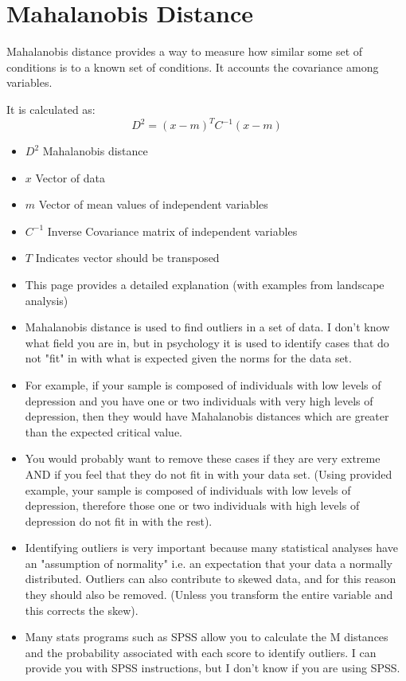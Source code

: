 \documentclass[11pt]{article} %
\begin{document}
\tableofcontents
\newpage

\section{Mahalanobis Distance}


Mahalanobis distance provides a way to measure how similar some set of conditions is to a known set of conditions. It accounts the covariance among variables.

It is calculated as:
\[D^2=(x-m)^TC^{-1}(x-m)\]
\begin{itemize}
\item $D^2$ Mahalanobis distance
\item $x$ Vector of data
\item $m$ Vector of mean values of independent variables
\item $C^{-1}$ Inverse Covariance matrix of independent variables
\item $T$ Indicates vector should be transposed
\end{itemize}

\begin{itemize}

\item This page provides a detailed explanation (with examples from landscape analysis)


\item Mahalanobis distance is used to find outliers in a set of data. I don't know what field you are in, but in psychology it is used to identify cases that do not "fit" in with what is expected given the norms for the data set. 

\item For example, if your sample is composed of individuals with low levels of depression and you have one or two individuals with very high levels of depression, then they would have Mahalanobis distances which are greater than the expected critical value. 

\item You would probably want to remove these cases if they are very extreme AND if you feel that they do not fit in with your data set. (Using provided example, your sample is composed of individuals with low levels of depression, therefore those one or two individuals with high levels of depression do not fit in with the rest). 

\item Identifying outliers is very important because many statistical analyses have an "assumption of normality" i.e. an expectation that your data a normally distributed. Outliers can also contribute to skewed data, and for this reason they should also be removed. (Unless you transform the entire variable and this corrects the skew). 

\item Many stats programs such as SPSS allow you to calculate the M distances and the probability associated with each score to identify outliers. I can provide you with SPSS instructions, but I don't know if you are using SPSS.
\end{itemize}
\end{document}
